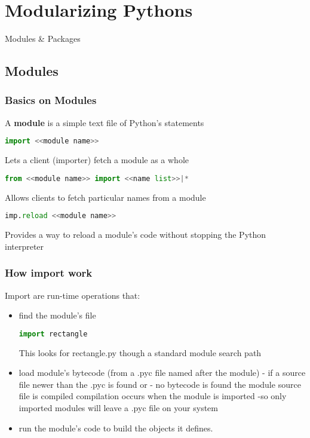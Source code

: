 \section{Modularizing Pythons}

Modules \& Packages

\subsection{Modules}

\subsubsection{Basics on Modules}

A \textbf{module} is a simple text file of Python's statements

\begin{lstlisting}[language=Python]
import <<module name>>
\end{lstlisting}

Lets a client (importer) fetch a module as a whole

\begin{lstlisting}[language=Python]
from <<module name>> import <<name list>>|*
\end{lstlisting}

Allows clients to fetch particular names from a module

\begin{lstlisting}[language=Python]
imp.reload <<module name>>
\end{lstlisting}

Provides a way to reload a module’s code without stopping the Python interpreter

\subsubsection{How import work}

Import are run-time operations that:

\begin{itemize}
  \item find the module's file
  \begin{lstlisting}[language=Python]
  import rectangle
  \end{lstlisting}
  This looks for rectangle.py though a standard module search path
  \item load module’s bytecode (from a .pyc file named after the module)
  - if a source file newer than the .pyc is found or
  - no bytecode is found the module source file is compiled
  compilation occurs when the module is imported
  -so only imported modules will leave a .pyc file on your system
  \item run the module’s code to build the objects it defines.
\end{itemize}


